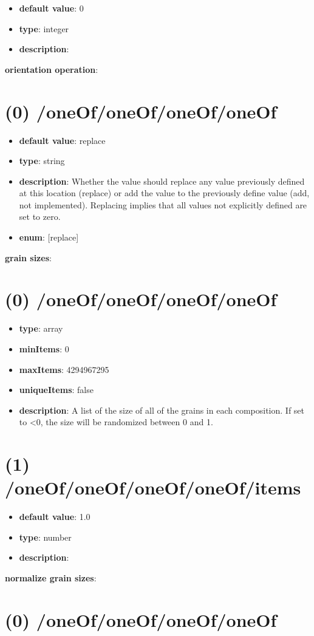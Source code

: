 \begin{itemize}[leftmargin=1em]\item {\bf default value}: 0
\item {\bf type}: integer
\item {\bf description}: 
\end{itemize}\item {\bf orientation operation}: \section{(0) /oneOf/oneOf/oneOf/oneOf}
\begin{itemize}[leftmargin=0em]\item {\bf default value}: replace
\item {\bf type}: string
\item {\bf description}: Whether the value should replace any value previously defined at this location (replace) or add the value to the previously define value (add, not implemented). Replacing implies that all values not explicitly defined are set to zero.
\item {\bf enum}: [replace]\end{itemize}\item {\bf grain sizes}: \section{(0) /oneOf/oneOf/oneOf/oneOf}
\begin{itemize}[leftmargin=0em]\item {\bf type}: array
\item {\bf minItems}: 0
\item {\bf maxItems}: 4294967295
\item {\bf uniqueItems}: false
\item {\bf description}: A list of the size of all of the grains in each composition. If set to <0, the size will be randomized between 0 and 1.
\end{itemize}\section{(1) /oneOf/oneOf/oneOf/oneOf/items}
\begin{itemize}[leftmargin=1em]\item {\bf default value}: 1.0
\item {\bf type}: number
\item {\bf description}: 
\end{itemize}\item {\bf normalize grain sizes}: \section{(0) /oneOf/oneOf/oneOf/oneOf}
